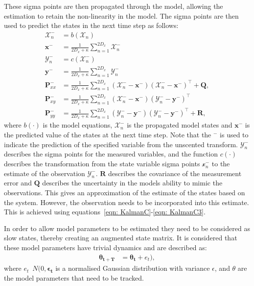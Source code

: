 These sigma points are then propagated through the model, allowing the estimation to retain the non-linearity in the model. The sigma points are then used to predict the states in the next time step as follows: \begin{align}
\mathbf{\mathcal{X}}_{n}^{-} &= b(\mathbf{\mathcal{X}}_{n})\\
\mathbf{x}^{-} &= \frac{1}{2D_{x}+\kappa}\sum_{n=1}^{2D_{x}} \mathbf{\mathcal{X}}_{n}^{-}\\
\mathbf{\mathcal{Y}}_{n}^{-} &= c(\mathbf{\mathcal{X}}_{n}^{-})\\
\mathbf{{y}}^{-} &= \frac{1}{2D_{x}+\kappa}\sum_{n=1}^{2D_{x}} \mathbf{\mathcal{Y}}_{n}^{-}\\
\label{eqn: statecovg}
\mathbf{P}_{xx}^{-} &= \frac{1}{2D_{x}+\kappa}\sum_{n=1}^{2D_{x}} (\mathbf{\mathcal{X}}_{n}^{-}-\mathbf{x}^{-})(\mathbf{\mathcal{X}}_{n}^{-}-\mathbf{x}^{-})^{\top} +\mathbf{Q},\\
\mathbf{P}_{xy}^{-} &= \frac{1}{2D_{x}+\kappa}\sum_{n=1}^{2D_{x}} (\mathbf{\mathcal{X}}_{n}^{-}-\mathbf{x}^{-}) (\mathbf{\mathcal{Y}}_{n}^{-}-\mathbf{{y}}^{-})^{\top}\\
\mathbf{P}_{yy}^{-} &= \frac{1}{2D_{x}+\kappa}\sum_{n=1}^{2D_{x}} (\mathbf{\mathcal{Y}}_{n}^{-}-\mathbf{{y}}^{-}) (\mathbf{\mathcal{Y}}_{n}^{-}-\mathbf{{y}}^{-})^{\top} +\mathbf{R},
\end{align} where $b(\cdot)$ is the model equations, $\mathbf{\mathcal{X}}_{n}^{-}$ is the propagated model states and $\mathbf{x}^{-}$ is the predicted value of the states at the next time step. Note that the $^{-}$ is used to indicate the prediction of the specified variable from the unscented transform. $\mathbf{\mathcal{Y}}_{n}^{-}$ describes the sigma points for the measured variables, and the function $c(\cdot)$ describes the transformation from the state variable sigma points $\mathbf{\mathcal{x}}_{n}^{-}$ to the estimate of the observation $\mathbf{\mathcal{Y}}_{n}^{-}$. $\mathbf{R}$ describes the covariance of the measurement error and $\mathbf{Q}$ describes the uncertainty in the models ability to mimic the observations. This gives an approximation of the estimate of the states based on the system. However, the observation needs to be incorporated into this estimate. This is achieved using equations~\ref{eqn: KalmanC}-\ref{eqn: KalmanC3}.

In order to allow model parameters to be estimated they need to be considered as slow states, thereby creating an augmented state matrix. It is considered that these model parameters have trivial dynamics and are described as: \begin{align}
\mathbf{\theta_{t+T}} &= \mathbf{\theta_{t}} +e_{t}),
\end{align} where $e_{t}$~$N(0,\mathbf{\epsilon_{t}}$ is a normalised Gaussian distribution with variance $\epsilon$, and $\theta$ are the model parameters that need to be tracked. 

